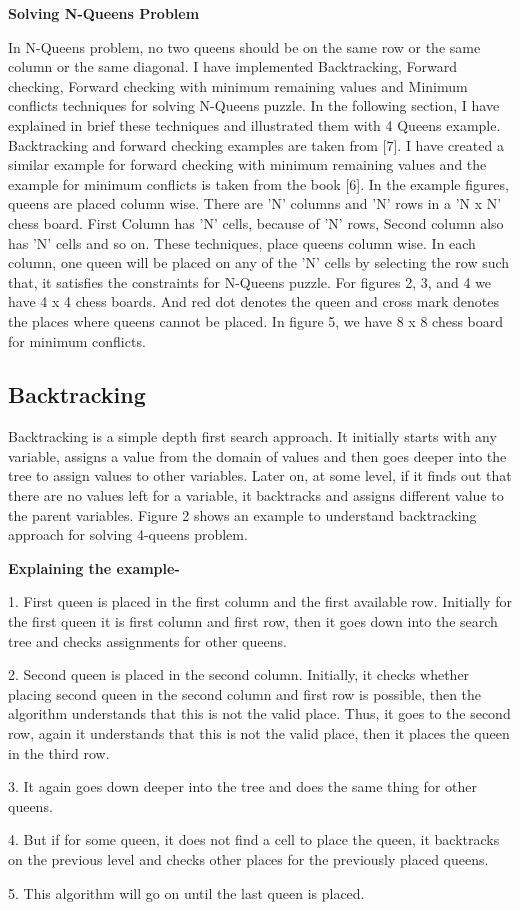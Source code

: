 \documentclass[conference]{IEEEtran}
\begin{document}
 
\textbf{Solving N-Queens Problem}
\par In N-Queens problem, no two queens should be on the same row or the same column or the same diagonal. I have implemented Backtracking, Forward checking, Forward checking with minimum remaining values and Minimum conflicts techniques for solving N-Queens puzzle. In the following section, I have explained in brief these techniques and illustrated them with 4 Queens example. Backtracking and forward checking examples are taken from [7]. I have created a similar example for forward checking with minimum remaining values and the example for minimum conflicts is taken from the book [6]. In the example figures, queens are placed column wise. There are 'N' columns and 'N' rows in a 'N x N' chess board. First Column has 'N' cells, because of 'N' rows, Second column also has 'N' cells and so on. These techniques, place queens column wise. In each column, one queen will be placed on any of the 'N' cells by selecting the row such that, it satisfies the constraints for N-Queens puzzle. For figures 2, 3, and 4 we have 4 x 4 chess boards. And red dot denotes the queen and cross mark denotes the places where queens cannot be placed. In figure 5, we have 8 x 8 chess board for minimum conflicts.

\subsection{Backtracking}
 Backtracking is a simple depth first search approach. It initially starts with any variable, assigns a value from the domain of values and then goes deeper into the tree to assign values to other variables. Later on, at some level, if it finds out that there are no values left for a variable, it backtracks and assigns different value to the parent variables. Figure 2 shows an example to understand backtracking approach for solving 4-queens problem.
 
 \textbf{Explaining the example- }

1. First queen is placed in the first column and the first available row. Initially for the first queen it is first column and first row, then it goes down into the search tree and checks assignments for other queens.
\par 2. Second queen is placed in the second column. Initially, it checks whether placing second queen in the second column and first row is possible, then the algorithm understands that this is not the valid place. Thus, it goes to the second row, again it understands that this is not the valid place, then it places the queen in the third row.
\par 3. It again goes down deeper into the tree and does the same thing for other queens.
\par 4. But if for some queen, it does not find a cell to place the queen, it backtracks on the previous level and checks other places for the previously placed queens.
\par 5. This algorithm will go on until the last queen is placed.
\end{document}
